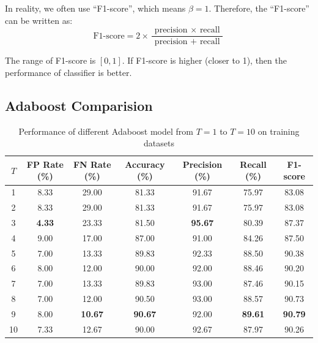 \documentclass{article}[12pt]
\begin{document}
In reality, we often use ``F1-score'', which means $\beta=1$. Therefore, the ``F1-score'' can be written as:
\begin{equation}
    \text {F1-score}=2 \times \frac{\text { precision } \times \text { recall }}{\text { precision }+\text { recall }}
\end{equation}

The range of F1-score is $[0, 1]$. If F1-score is higher (closer to 1), 
then the performance of classifier is better.

\subsection{Adaboost Comparision} \label{subsec:ada_comp}

\begin{table}[H]
    \centering    
    \caption{Performance of different Adaboost model from $T=1$ to $T=10$ on training datasets}
    \begin{tabular}{@{}ccccccc@{}}
    	\toprule
    	$T$ & FP Rate (\%)  &  FN Rate (\%)  & Accuracy (\%)  & Precision (\%) &  Recall (\%)   &    F1-score    \\ \midrule
    	 1  &     8.33      &     29.00      &     81.33      &     91.67      &     75.97      &     83.08      \\
    	 2  &     8.33      &     29.00      &     81.33      &     91.67      &     75.97      &     83.08      \\
    	 3  & \textbf{4.33} &     23.33      &     81.50      & \textbf{95.67} &     80.39      &     87.37      \\
    	 4  &     9.00      &     17.00      &     87.00      &     91.00      &     84.26      &     87.50      \\
    	 5  &     7.00      &     13.33      &     89.83      &     92.33      &     88.50      &     90.38      \\
    	 6  &     8.00      &     12.00      &     90.00      &     92.00      &     88.46      &     90.20      \\
    	 7  &     7.00      &     13.33      &     89.83      &     93.00      &     87.46      &     90.15      \\
    	 8  &     7.00      &     12.00      &     90.50      &     93.00      &     88.57      &     90.73      \\
    	 9  &     8.00      & \textbf{10.67} & \textbf{90.67} &     92.00      & \textbf{89.61} & \textbf{90.79} \\
    	10  &     7.33      &     12.67      &     90.00      &     92.67      &     87.97      &     90.26      \\ \bottomrule
    \end{tabular}
        \label{tab:ada_train}
\end{table}
\end{document}
